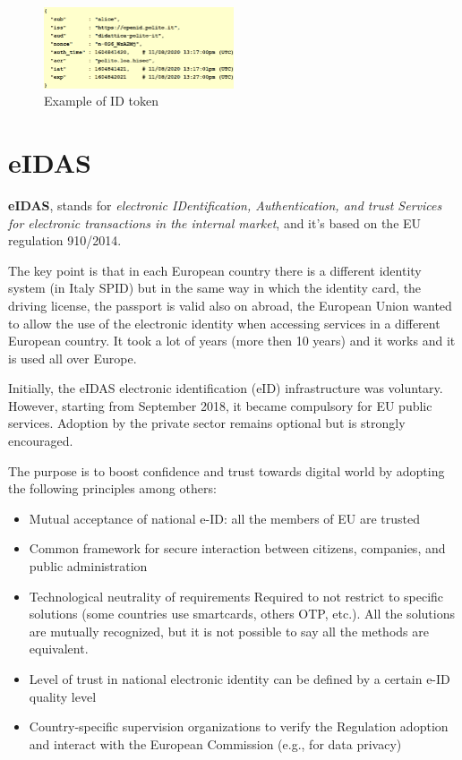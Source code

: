 \begin{figure}[H]
  \centering
  \includegraphics[width=0.5\textwidth]{img/oicd token.png}
  \caption{Example of ID token}

\end{figure}

\section{eIDAS}

\textbf{eIDAS}, stands for \textit{electronic IDentification, Authentication, 
and trust Services for electronic transactions in the internal
market}, and it's based on the EU regulation 910/2014.

The key point is that in each European country there is a different
identity system (in Italy SPID) but in the same way in which the
identity card, the driving license, the passport is valid also on
abroad, the European Union wanted to allow the use of the electronic
identity when accessing services in a different European country. It
took a lot of years (more then 10 years) and it works and it is used
all over Europe.

Initially, the eIDAS electronic identification (eID) infrastructure was 
voluntary. However, starting from September 2018, it became compulsory for 
EU public services. Adoption by the private sector remains optional but is 
strongly encouraged.

The purpose is to boost confidence and trust towards digital world by
adopting the following principles among others:
\begin{itemize}
  \item Mutual acceptance of national e-ID: all the members of EU are
    trusted
  \item Common framework for secure interaction between citizens,
    companies, and public administration
  \item Technological neutrality of requirements Required to not
    restrict to specific solutions (some countries use smartcards,
    others OTP, etc.). All the solutions are mutually recognized, but
    it is not possible to say all the methods are equivalent.
  \item Level of trust in national electronic identity can be defined
    by a certain e-ID quality level
  \item Country-specific supervision organizations to verify the
    Regulation adoption and interact with the European Commission
    (e.g., for data privacy)
\end{itemize}

